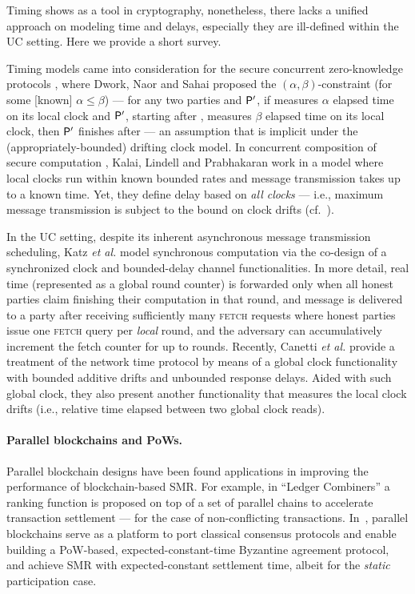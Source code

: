 Timing shows as a tool in cryptography, nonetheless, there lacks a unified approach on modeling time and delays, especially they are ill-defined within the UC setting.
%
Here we provide a short survey.

Timing models came into consideration for the secure concurrent zero-knowledge protocols \cite{STOC:DwoNaoSah98,C:DwoSah98}, where Dwork, Naor and Sahai proposed the $(\alpha, \beta)$-constraint (for some [known] $\alpha \le \beta$) --- for any two parties \party and  $\mathsf{P}'$, if \party measures $\alpha$ elapsed time on its local clock and $\mathsf{P}'$, starting after \party, measures $\beta$ elapsed time on its local clock, then $\mathsf{P}'$ finishes after \party --- an assumption that is implicit under the (appropriately-bounded) drifting clock model.
%
In concurrent composition of secure computation \cite{STOC:KalLinPra05}, Kalai, Lindell and Prabhakaran work in a model where local clocks run within known bounded rates and message transmission takes up to a known \delay time.
%
Yet, they define delay based on \emph{all clocks} --- i.e., maximum message transmission is subject to the bound on clock drifts (cf.~\cite[footnote 10]{STOC:KalLinPra05}).

In the UC setting, despite its inherent asynchronous message transmission scheduling, Katz \textit{et al.} \cite{TCC:KMTZ13} model synchronous computation via the co-design of a synchronized clock and bounded-delay channel functionalities.
%
In more detail, real time (represented as a global round counter) is forwarded only when all honest parties claim finishing their computation in that round, and message is delivered to a party after receiving sufficiently many \textsc{fetch} requests where honest parties issue one \textsc{fetch} query per \emph{local} round, and the adversary can accumulatively increment the fetch counter for up to \delay rounds.
%
Recently, Canetti \textit{et al.} \cite{CSF:CHMV17} provide a treatment of the network time protocol by means of a global clock functionality with bounded additive drifts and unbounded response delays.
%
Aided with such global clock, they also present another functionality that measures the local clock drifts (i.e., relative time elapsed between two global clock reads).

\paragraph{Parallel blockchains and \mforone PoWs.}
%
Parallel blockchain designs have been found applications in improving the performance of blockchain-based SMR.
%
For example, in ``Ledger Combiners'' \cite{TCC:FGKR20} a ranking function is proposed on top of a set of  parallel chains to accelerate transaction settlement --- for the case of non-conflicting transactions.
%
In~\cite{EC:GarKiaShe24}, parallel blockchains serve as a platform to port classical consensus protocols and enable building a PoW-based, expected-constant-time Byzantine agreement protocol, and achieve SMR with expected-constant settlement time, albeit for the \emph{static} participation case.

